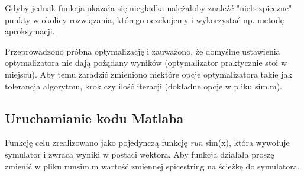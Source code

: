 \documentclass{article}
\begin{document}
Gdyby jednak funkcja okazała się niegładka należałoby znaleźć "niebezpieczne" punkty w okolicy rozwiązania, którego oczekujemy i wykorzystać np. metodę aproksymacji.

Przeprowadzono próbna optymalizację i zauważono, że domyślne ustawienia optymalizatora nie dają pożądany wyników (optymalizator praktycznie stoi w miejscu). 
Aby temu zaradzić zmieniono niektóre opcje optymalizatora takie jak tolerancja algorytmu, krok czy ilość iteracji (dokładne opcje w pliku sim.m).

\subsection{Uruchamianie kodu Matlaba}
Funkcję celu zrealizowano jako pojedynczą funkcję \textit{run\textunderscore} sim(x), która wywołuje symulator i zwraca wyniki w postaci wektora.
Aby funkcja działała proszę zmienić w pliku run\textunderscore sim.m wartość zmiennej 
 spice\textunderscore string na ścieżkę do symulatora. 
\end{document}
